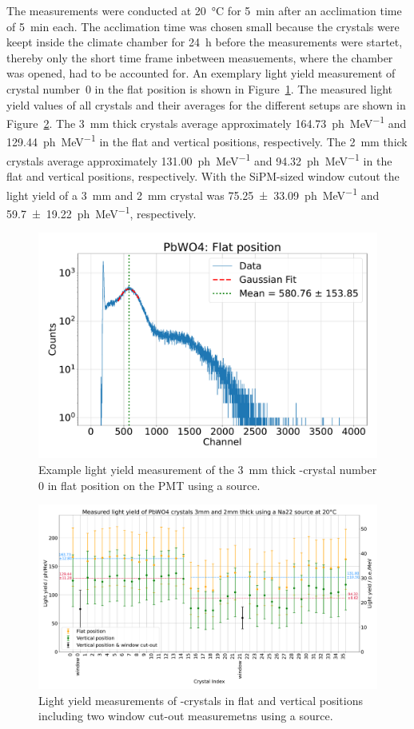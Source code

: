 The measurements were conducted at \SI{20}{\celsius} for \SI{5}{\minute} after an acclimation time of \SI{5}{\minute} each.
The acclimation time was chosen small because the crystals were keept inside the climate chamber for \SI{24}{\hour} before the measurements were startet, thereby only the short time frame inbetween measuements, where the chamber was opened, had to be accounted for.
An exemplary light yield measurement of crystal number~0 in the flat position is shown in Figure~\ref{fig:lightyield:pwo:measurement:0}.
The measured light yield values of all crystals and their averages for the different setups are shown in Figure~\ref{fig:lightyield:pwo:measurement:all}.
The \SI{3}{\milli\meter} thick crystals average approximately \SI{164.73}{ph\per\mega\electronvolt} and \SI{129.44}{ph\per\mega\electronvolt} in the flat and vertical positions, respectively.
The \SI{2}{\milli\meter} thick crystals average approximately \SI{131.00}{ph\per\mega\electronvolt} and \SI{94.32}{ph\per\mega\electronvolt} in the flat and vertical positions, respectively.
With the SiPM-sized window cutout the light yield of a \SI{3}{\milli\meter} and \SI{2}{\milli\meter} crystal was \SI{75.25\pm 33.09}{ph\per\mega\electronvolt} and \SI{59.7\pm 19.22}{ph\per\mega\electronvolt}, respectively.

\begin{figure}[h]
    \centering
    \includegraphics[width=0.5\linewidth]{fig/lightyield/pwo/bps_na_flat.pdf}
    \caption{Example light yield measurement of the \SI{3}{\milli\meter} thick -crystal number 0 in flat position on the \gls{PMT} using a  source.}\label{fig:lightyield:pwo:measurement:0}
\end{figure}

\begin{figure}[h]
    \centering
    \includegraphics[width=1\linewidth]{fig/lightyield/pwo/bps_na22_all.pdf}
    \caption{Light yield measurements of -crystals in flat and vertical positions including two window cut-out measuremetns using a  source.}\label{fig:lightyield:pwo:measurement:all}
\end{figure}

